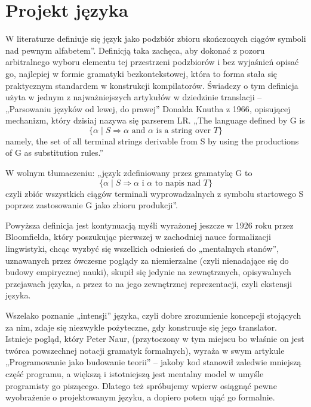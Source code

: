 \chapter{Projekt języka}
\label{cha:wywodJezyka}
W literaturze definiuje się język jako podzbiór zbioru skończonych ciągów symboli nad pewnym alfabetem”\cite{hopcroft_automaty}. Definicją taka zachęca, aby dokonać z pozoru arbitralnego wyboru elementu tej przestrzeni podzbiorów i bez wyjaśnień opisać go, najlepiej w formie gramatyki bezkontekstowej, która to forma stała się praktycznym standardem w konstrukcji kompilatorów. Świadczy o tym definicja użyta w jednym z najważniejszych artykułów w dziedzinie translacji – „Parsowaniu języków od lewej, do prawej” Donalda Knutha z 1966\cite{TRANSLATION_FROM_LEFT_TO_RIGHT}, opisującej mechanizm, który dzisiaj nazywa się parserem LR. 
„The language defined by G is
\[
\{ \alpha \mid S \Rightarrow \alpha \text{ and } \alpha \text{ is a string over } T \}
\]
namely, the set of all terminal strings derivable from S by using the productions of G as substitution rules.”

W wolnym tłumaczeniu:
„język zdefiniowany przez gramatykę G to \[
\{ \alpha \mid S \Rightarrow \alpha \text{ i } \alpha \text{ to napis nad } T \}
\]czyli zbiór wszystkich ciągów terminali wyprowadzalnych z symbolu startowego S poprzez zastosowanie G jako zbioru produkcji”.

Powyższa definicja jest kontynuacją myśli wyrażonej jeszcze w 1926 roku przez Bloomfielda\cite{BLOOMFIELD_1926}, który poszukując pierwszej w zachodniej nauce formalizacji lingwistyki, chcąc wyzbyć się wszelkich odniesień do „mentalnych stanów”, uznawanych przez ówczesne poglądy za niemierzalne (czyli nienadające się do budowy empirycznej nauki), skupił się jedynie na zewnętrznych, opisywalnych przejawach języka, a przez to na jego zewnętrznej reprezentacji,  czyli ekstensji języka\cite{parsing_timeline_kegler}.

Wszelako poznanie „intensji” języka, czyli dobre zrozumienie koncepcji stojących za nim, zdaje się niezwykle pożyteczne, gdy konstruuje się jego translator. Istnieje pogląd, który Peter Naur, (przytoczony w tym miejscu bo właśnie on jest twórca powszechnej notacji gramatyk formalnych), wyraża w swym artykule „Programowanie jako budowanie teorii” – jakoby kod stanowił zaledwie mniejszą część programu, a większą i istotniejszą jest mentalny model w umyśle programisty go piszącego\cite{NAUR_1985}. Dlatego też spróbujemy wpierw osiągnąć pewne wyobrażenie o projektowanym języku, a dopiero potem ująć go formalnie. 

